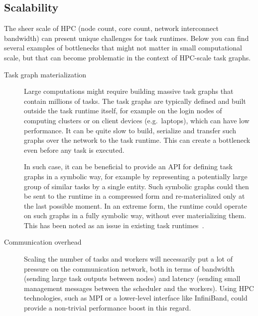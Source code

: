 \subsection{Scalability}
The sheer scale of HPC (node count, core count, network interconnect bandwidth) can present
unique challenges for task runtimes. Below you can find several examples of bottlenecks that
might not matter in small computational scale, but that can become problematic in the context of
HPC-scale task graphs.

\begin{description}
    \item[Task graph materialization] Large computations might require building massive task
    graphs that contain millions of tasks. The task graphs are typically defined and built
    outside the task runtime itself, for example on the login nodes of computing clusters or on
    client devices (e.g.\ laptops), which can have low performance. It can be quite slow to
    build, serialize and transfer such graphs over the network to the task runtime. This can
    create a bottleneck even before any task is executed.

    In such case, it can be beneficial to provide an API for defining task graphs in a symbolic
    way, for example by representing a potentially large group of similar tasks by a single
    entity. Such symbolic graphs could then be sent to the runtime in a
    compressed form and re-materialized only at the last possible moment. In an extreme form,
    the runtime could operate on such graphs in a fully symbolic way, without ever
    materializing them. This has been noted as an issue in existing task
    runtimes~\cite{dask-client-perf}.
    \item[Communication overhead] Scaling the number of tasks and workers will necessarily put a
    lot of pressure on the communication network, both in terms of bandwidth (sending large task
    outputs between nodes) and latency (sending small management messages between the scheduler
    and the workers). Using HPC technologies, such as MPI or a lower-level interface like
    InfiniBand, could provide a non-trivial performance boost in this regard.


\end{description}
